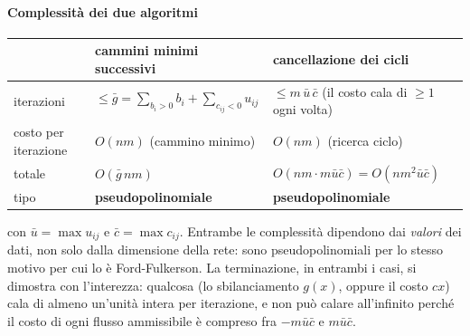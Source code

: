 \documentclass[12pt]{extarticle} %
\begin{document}
\paragraph{Complessità dei due algoritmi}
\begin{center}
\begin{tabular}{lll}
\hline
 & \textbf{cammini minimi successivi} & \textbf{cancellazione dei cicli} \\
\hline
iterazioni & $\le \bar{g} = \sum_{b_i>0} b_i + \sum_{c_{ij}<0} u_{ij}$ & $\le m\,\bar{u}\,\bar{c}$ (il costo cala di $\ge 1$ ogni volta) \\
costo per iterazione & $O(nm)$ (cammino minimo) & $O(nm)$ (ricerca ciclo) \\
totale & $O(\bar{g}\,nm)$ & $O(nm \cdot m\bar{u}\bar{c}) = O(nm^2\bar{u}\bar{c})$ \\
tipo & \textbf{pseudopolinomiale} & \textbf{pseudopolinomiale} \\
\hline
\end{tabular}
\end{center}
\noindent con $\bar{u} = \max u_{ij}$ e $\bar{c} = \max c_{ij}$. Entrambe le complessità dipendono dai \emph{valori} dei dati, non solo dalla dimensione della rete: sono pseudopolinomiali per lo stesso motivo per cui lo è Ford-Fulkerson. La terminazione, in entrambi i casi, si dimostra con l'interezza: qualcosa (lo sbilanciamento $g(x)$, oppure il costo $cx$) cala di almeno un'unità intera per iterazione, e non può calare all'infinito perché il costo di ogni flusso ammissibile è compreso fra $-m\bar{u}\bar{c}$ e $m\bar{u}\bar{c}$.
\end{document}
